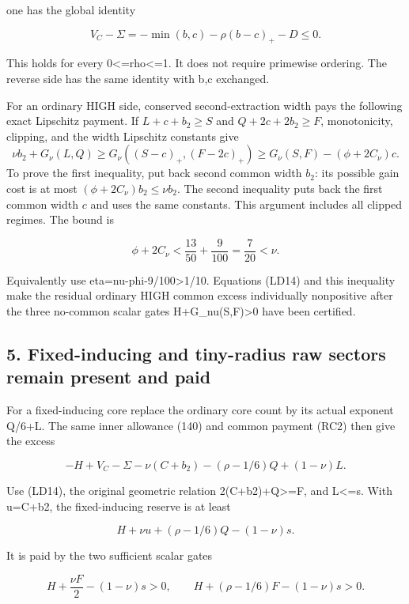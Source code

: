 one has the global identity

\[
 V_C-\Sigma=-\min(b,c)-\rho(b-c)_+-D\le0.              \tag{LD14}
\]

This holds for every 0\textless=rho\textless=1. It does not require primewise ordering. The reverse side has the same identity with b,c exchanged.

For an ordinary HIGH side, conserved second-extraction width pays the following exact Lipschitz payment. If \(L+c+b_2\ge S\) and \(Q+2c+2b_2\ge F\), monotonicity, clipping, and the width Lipschitz constants give \[
 \nu b_2+G_\nu(L,Q)
 \ge G_\nu((S-c)_+,(F-2c)_+)
 \ge G_\nu(S,F)-(\phi+2C_\nu)c.
 \tag{LD14a}
\] To prove the first inequality, put back second common width \(b_2\): its possible gain cost is at most \((\phi+2C_\nu)b_2\le\nu b_2\). The second inequality puts back the first common width \(c\) and uses the same constants. This argument includes all clipped regimes. The bound is

\[
 \phi+2C_\nu<\frac{13}{50}+\frac9{100}=\frac7{20}<\nu.
\]

Equivalently use eta=nu-phi-9/100\textgreater1/10. Equations (LD14) and this inequality make the residual ordinary HIGH common excess individually nonpositive after the three no-common scalar gates H+G\_\allowbreak{}nu(S,F)\textgreater0 have been certified.

\hypertarget{sources:fixed-inducing-and-tiny-radius-raw-sectors-remain-present-and-paid}{%
\subsection{5. Fixed-inducing and tiny-radius raw sectors remain present and paid}\label{sources:fixed-inducing-and-tiny-radius-raw-sectors-remain-present-and-paid}}

For a fixed-inducing core replace the ordinary core count by its actual exponent Q/6+L. The same inner allowance (140) and common payment (RC2) then give the excess

\[
 -H+V_C-\Sigma-\nu(C+b_2)
       -(\rho-1/6)Q+(1-\nu)L.                        \tag{LD15}
\]

Use (LD14), the original geometric relation 2(C+b2)+Q\textgreater=F, and L\textless=s. With u=C+b2, the fixed-inducing reserve is at least

\[
 H+\nu u+(\rho-1/6)Q-(1-\nu)s.
\]

It is paid by the two sufficient scalar gates

\[
 H+\frac{\nu F}{2}-(1-\nu)s>0,\qquad
 H+(\rho-1/6)F-(1-\nu)s>0.                        \tag{LD16}
\]

